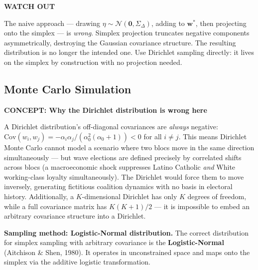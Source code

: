 \documentclass[11pt]{article}
\newcommand{\concept}[2]{%
  \begin{mdframed}[style=conceptbox]
  {\small\bfseries\color{bluefg}CONCEPT: #1}\par\smallskip #2
  \end{mdframed}}
\newcommand{\warnbox}[1]{%
  \begin{mdframed}[style=warnbox]
  {\small\bfseries\color{amberfg}WATCH OUT}\par\smallskip #1
  \end{mdframed}}
\begin{document}
\warnbox{
The naive approach --- drawing $\eta \sim \mathcal{N}(\mathbf{0}, \Sigma_\Delta)$,
adding to $\mathbf{w}^*$, then projecting onto the simplex --- is \emph{wrong}. Simplex
projection truncates negative components asymmetrically, destroying the Gaussian
covariance structure. The resulting distribution is no longer the intended one.
Use Dirichlet sampling directly: it lives on the simplex by construction with no
projection needed.
}

\subsection*{Monte Carlo Simulation}

\concept{Why the Dirichlet distribution is wrong here}{
A Dirichlet distribution's off-diagonal covariances are \emph{always} negative:
$\text{Cov}(w_i, w_j) = -\alpha_i\alpha_j/(\alpha_0^2(\alpha_0+1)) < 0$ for all
$i \neq j$. This means Dirichlet Monte Carlo cannot model a scenario where two blocs
move in the same direction simultaneously --- but wave elections are defined precisely
by correlated shifts across blocs (a macroeconomic shock suppresses Latino Catholic
\emph{and} White working-class loyalty simultaneously). The Dirichlet would force
them to move inversely, generating fictitious coalition dynamics with no basis in
electoral history. Additionally, a $K$-dimensional Dirichlet has only $K$ degrees
of freedom, while a full covariance matrix has $K(K+1)/2$ --- it is impossible to
embed an arbitrary covariance structure into a Dirichlet.
}

\textbf{Sampling method: Logistic-Normal distribution.}
The correct distribution for simplex sampling with arbitrary covariance is the
\textbf{Logistic-Normal} (Aitchison \& Shen, 1980). It operates in unconstrained
space and maps onto the simplex via the additive logistic transformation.
\end{document}
